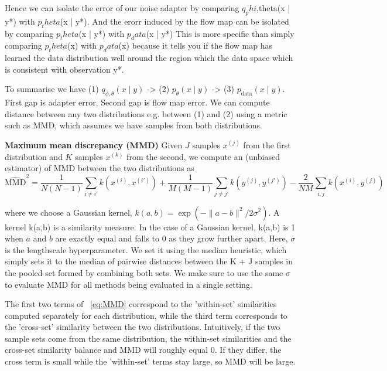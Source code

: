 \documentclass[12pt,a4paper]{report}
\begin{document}
Hence we can isolate the error of our noise adapter by comparing $q_phi$,theta(x | y*) with $p_theta$(x | y*). 
And the erorr induced by the flow map can be isolated by comparing $p_theta$(x | y*) with $p_data$(x | y*)
This is more specific than simply comparing $p_theta$(x) with $p_data$(x) because it tells you if the flow map has learned the data distribution well around the region which the data space which is consistent with observation y*. 

To summarise we have (1) $q_{\phi, \theta}(x \mid y)$ -> (2) $p_\theta(x \mid y)$ -> (3) $p_\text{data}(x \mid y)$. %
First gap is adapter error. Second gap is flow map error. 
We can compute distance between any two distributions e.g. between (1) and (2) using a metric such as MMD, which assumes we have samples from both distributions. 

\textbf{Maximum mean discrepancy (MMD)}
Given $J$ samples $x^{(j)}$ from the first distribution and $K$ samples $x^{(k)}$ from the second, we compute an (unbiased estimator) of MMD between the two distributions as
\begin{equation}
\label{eq:MMD}
\widehat{\text{MMD}}^2 = \frac{1}{N(N-1)} \sum_{i \neq i'} k(x^{(i)}, x^{(i')}) + \frac{1}{M(M-1)} \sum_{j \neq j'} k(y^{(j)}, y^{(j')}) - \frac{2}{NM} \sum_{i,j} k(x^{(i)}, y^{(j)})
\end{equation}

where we choose a Gaussian kernel, $k(a,b)= \exp( -\|a - b\|^2 / 2\sigma^2 )$. 
A kernel k(a,b) is a similarity measure. In the case of a Gaussian kernel, k(a,b) is 1 when $a$ and $b$ are exactly equal and falls to 0 as they grow further apart.
Here, $\sigma$ is the lengthscale hyperparameter. We set it using the median heuristic, which simply sets it to the median of pairwise distances between the K + J samples in the pooled set formed by combining both sets. 
We make sure to use the same $\sigma$ to evaluate MMD for all methods being evaluated in a single setting.  


The first two terms of ~\ref{eq:MMD} correspond to the 'within-set' similarities computed separately for each distribution, while the third term corresponds to the 'cross-set' similarity between the two distributions. Intuitively, if the two sample sets come from the same distribution, the within-set similarities and the cross-set similarity balance and MMD will roughly equal 0. If they differ, the cross term is small while the 'within-set' terms stay large, so MMD will be large. 
\end{document}
